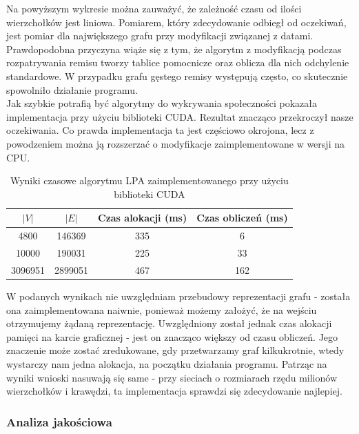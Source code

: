 \documentclass{article}
\begin{document}
Na powyższym wykresie można zauważyć, że zależność czasu od ilości wierzchołków jest liniowa. Pomiarem, który zdecydowanie odbiegł od oczekiwań, jest pomiar dla największego grafu przy modyfikacji związanej z datami. Prawdopodobna przyczyna wiąże się z tym, że algorytm z modyfikacją podczas rozpatrywania remisu tworzy tablice pomocnicze oraz oblicza dla nich odchylenie standardowe. W przypadku grafu gęstego remisy występują często, co skutecznie spowolniło działanie programu.\\

Jak szybkie potrafią być algorytmy do wykrywania społeczności pokazała implementacja przy użyciu biblioteki CUDA. Rezultat znacząco przekroczył nasze oczekiwania. Co prawda implementacja ta jest częściowo okrojona, lecz z powodzeniem można ją rozszerzać o modyfikacje zaimplementowane w wersji na CPU.

\begin{table}[H]
  \begin{center}
    
    \label{tab:table1}
    \begin{tabular}{c|c|c|c}
      \textbf{$|V|$} & \textbf{$|E|$} & \textbf{Czas alokacji (ms)} & \textbf{Czas obliczeń (ms)}\\
      \hline
      4800 & 146369 & 335 & 6\\
      10000 & 190031 & 225 & 33 \\
      3096951 & 2899051 & 467 & 162 \\
    \end{tabular}
    \caption{Wyniki czasowe algorytmu LPA zaimplementowanego przy użyciu biblioteki CUDA}
  \end{center}
\end{table}

W podanych wynikach nie uwzględniam przebudowy reprezentacji grafu - została ona zaimplementowana naiwnie, ponieważ możemy założyć, że na wejściu otrzymujemy żądaną reprezentację. Uwzględniony został jednak czas alokacji pamięci na karcie graficznej - jest on znacząco większy od czasu obliczeń. Jego znaczenie może zostać zredukowane, gdy przetwarzamy graf kilkukrotnie, wtedy wystarczy nam jedna alokacja, na początku działania programu. Patrząc na wyniki wnioski nasuwają się same - przy sieciach o rozmiarach rzędu milionów wierzchołków i krawędzi, ta implementacja sprawdzi się zdecydowanie najlepiej.

\subsubsection{Analiza jakościowa}
\end{document}
